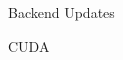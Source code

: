 
\begin{frame}[fragile]

  {\Huge Backend Updates}

  \vspace{10pt}

\end{frame}


\begin{frame}[fragile]

  {\Huge CUDA}

  \vspace{10pt}

\end{frame}
